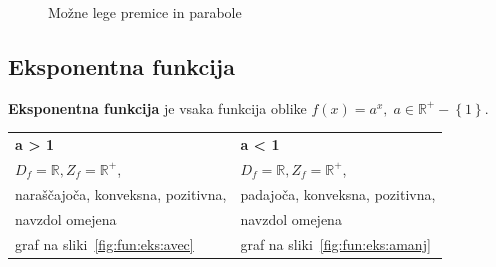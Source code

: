 \documentclass[a4paper,oneside,12pt,fleqn]{article}
\def\R{\ensuremath{\mathbb R}}
\newcommand{\beforecaptionskip}{\vspace{-12pt}}
\numberwithin{equation}{section}
\begin{document}
\begin{figure}[ht]
  \begin{center}
  \end{center}
  \beforecaptionskip
  \caption{Možne lege premice in parabole}
  \label{fig:fun:kvad:legapinp}
\end{figure}

\subsection{Eksponentna funkcija}
\label{sec:fun:eks}
\textbf{Eksponentna funkcija} je vsaka funkcija oblike $f(x) = a^x, \; a \in \R^+ - \left\{ 1
\right\}$.

\begin{tabular}{ll}
  \textbf{a > 1} & \textbf{a < 1} \\
  $D_f = \R, Z_f = \R^+$, & $D_f = \R, Z_f = \R^+$, \\
  naraščajoča, konveksna, pozitivna, & padajoča, konveksna, pozitivna, \\
  navzdol omejena & navzdol omejena \\
  graf na sliki~\ref{fig:fun:eks:avec} & graf na sliki~\ref{fig:fun:eks:amanj}
\end{tabular}
\end{document}
